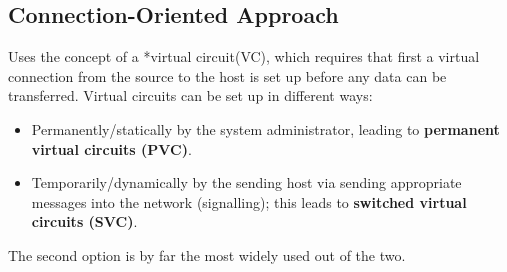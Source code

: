 \documentclass{article}%
\begin{document}
\subsection{Connection-Oriented Approach}
\label{sec:orgcf792ed}
Uses the concept of a *virtual circuit(VC), which requires that first a virtual connection from the source to the host is set up before any data can be transferred.
Virtual circuits can be set up in different ways:
\begin{itemize}
\item Permanently/statically by the system administrator, leading to \textbf{permanent virtual circuits (PVC)}.
\item Temporarily/dynamically by the sending host via sending appropriate messages into the network (signalling); this leads to \textbf{switched virtual circuits (SVC)}.
\end{itemize}
The second option is by far the most widely used out of the two.
\end{document}
